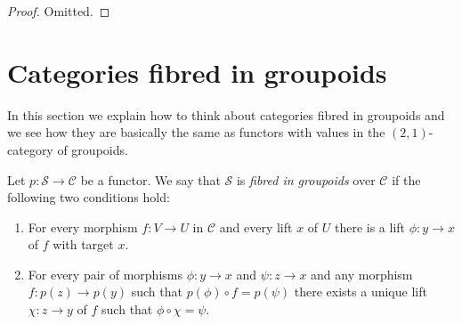 \begin{proof}
Omitted.
\end{proof}





\section{Categories fibred in groupoids}
\label{section-fibred-groupoids}

\noindent
In this section we explain how to think about categories fibred in groupoids
and we see how they are basically the same as functors with
values in the $(2, 1)$-category of groupoids.

\begin{definition}
\label{definition-fibred-groupoids}
Let $p : \mathcal{S} \to \mathcal{C}$ be a functor.
We say that $\mathcal{S}$ is {\it fibred in groupoids} over $\mathcal{C}$ if
the following two conditions hold:
\begin{enumerate}
\item For every morphism $f : V \to U$ in $\mathcal{C}$ and every
lift $x$ of $U$ there is a lift $\phi : y \to x$ of $f$ with
target $x$.
\item For every pair of morphisms $\phi : y \to x$ and $ \psi : z \to x$
and any morphism $f : p(z) \to p(y)$ such that $p(\phi) \circ f = p(\psi)$
there exists a unique lift $\chi : z \to y$ of $f$ such that
$\phi \circ \chi = \psi$.
\end{enumerate}
\end{definition}

